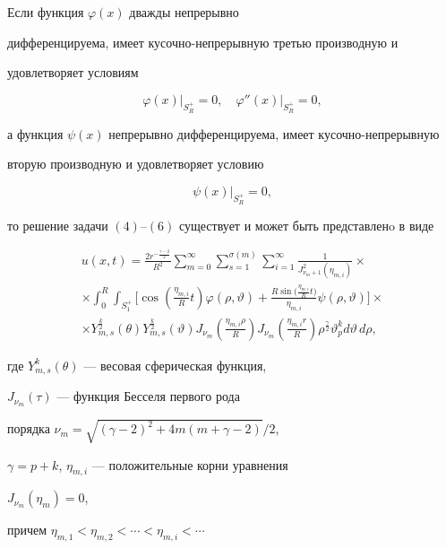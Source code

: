 \begin{thm}


Если функция $\varphi(x)$ дважды непрерывно 


дифференцируема, имеет кусочно-непрерывную третью производную и 


удовлетворяет условиям


$$


\varphi(x)\big|_{S^+_R}=0,\quad \varphi''(x)\big|_{S^+_R}=0,


$$ 


а функция $\psi(x)$ непрерывно дифференцируема, имеет кусочно-непрерывную 


вторую производную и удовлетворяет условию


$$


\psi(x)\big|_{S^+_R}=0,


$$


то решение задачи $(4)$--$(6)$ существует и может быть представленo в виде


\begin{multline}


u(x,t)=\frac{2r^{-\frac{\gamma-2}{2}}}{R^{2}}\sum\limits^{\infty}_{m=0}


\sum\limits^{\sigma(m)}_{s=1}\sum\limits^{\infty}_{i=1}


\frac{1}{J^2_{\nu_{m}+1} \left( \eta_{m,i} \right)} \times \\


%


\times


\int_{0}^{R}\int_{S^{+}_{1}}\bigg[\cos\left(\frac{\eta_{m,i}}


{R}t\right)\varphi(\rho,\vartheta)+\frac{R \sin\big(\frac{\eta_{m,i}}


{R}t\big)}{\eta_{m,i}}\psi(\rho,\vartheta)\bigg]\times \\


%


\times


Y^{\frac{k}{2}}_{m,s}(\theta)Y^{\frac{k}{2}}_{m,s}(\vartheta)


J_{\nu_{m}} \left( \frac{\eta_{m,i}\rho}{R} \right)J_{\nu_{m}}


\left( \frac{\eta_{m,i}r}{R}


\right)\rho^{\frac{\gamma}{2}}\vartheta^{k}_{p}


d\vartheta\, d\rho,


\end{multline}


где $Y^{k}_{m,s}(\theta)$ --- весовая сферическая функция,


$J_{\nu_{m}}(\tau)$ --- функция Бесселя первого рода 


порядка $\nu_{m}{=}\sqrt{(\gamma-2)^2+4m(m+\gamma-2)}/2$, 


$\gamma=p+k$, $\eta_{m,i}$ --- положительные корни уравнения


$J_{\nu_{m}}(\eta_{m}){=}0$,


причем $\eta_{m,1}<\eta_{m,2}<\dotsb<\eta_{m,i}<\dotsb$


\end{thm}





